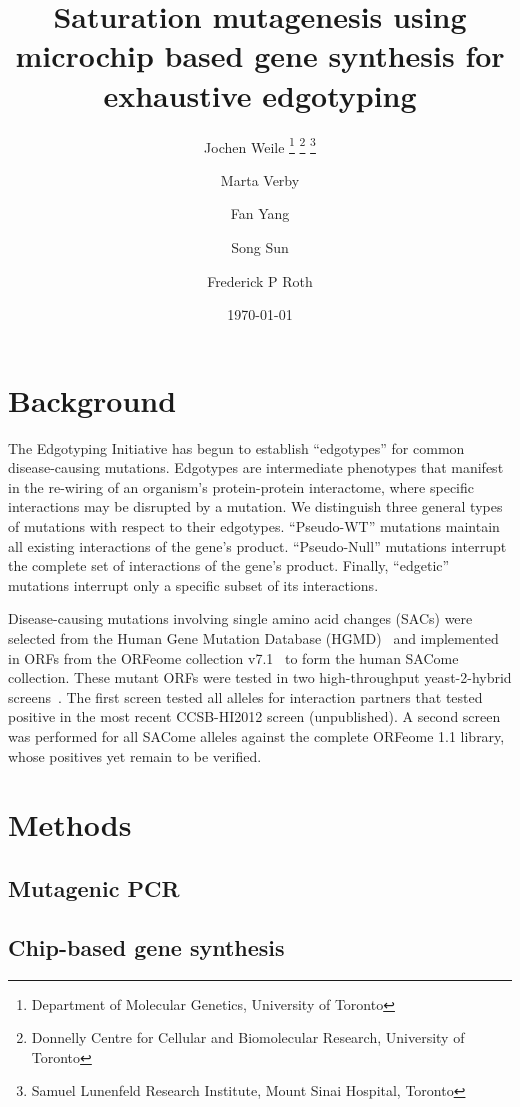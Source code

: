 \documentclass[12pt]{article}
\title{Saturation mutagenesis using microchip based gene synthesis for exhaustive edgotyping}
\author{
	Jochen Weile
		\thanks{Department of Molecular Genetics, University of Toronto}
		\thanks{Donnelly Centre for Cellular and Biomolecular Research, University of Toronto} 
		\thanks{Samuel Lunenfeld Research Institute, Mount Sinai Hospital, Toronto}
	\and Marta Verby
		\samethanks[3]
	\and Fan Yang
		\samethanks[1] \samethanks[3]
	\and Song Sun
		\samethanks[3]
	\and Frederick P Roth 
		\samethanks[1] \samethanks[2] \samethanks[3]
}
\date{\today}
\begin{document}
\maketitle

\section{Background} %
\label{sec:background}

The Edgotyping Initiative has begun to establish ``edgotypes'' for common disease-causing mutations. Edgotypes are intermediate phenotypes that manifest in the re-wiring of an organism's protein-protein interactome, where specific interactions may be disrupted by a mutation. We distinguish three general types of mutations with respect to their edgotypes. ``Pseudo-WT'' mutations maintain all existing interactions of the gene's product. ``Pseudo-Null'' mutations interrupt the complete set of interactions of the gene's product. Finally, ``edgetic'' mutations interrupt only a specific subset of its interactions.

Disease-causing mutations involving single amino acid changes (SACs) were selected from the Human Gene Mutation Database (HGMD)~\cite{stenson_human_2003} and implemented in ORFs from the ORFeome collection v7.1~\cite{rual_human_2004} to form the human SACome collection. These mutant ORFs were tested in two high-throughput yeast-2-hybrid screens~\cite{yu_high-quality_2008}. The first screen tested all alleles for interaction partners that tested positive in the most recent CCSB-HI2012 screen (unpublished). A second screen was performed for all SACome alleles against the complete ORFeome 1.1 library, whose positives yet remain to be verified.



\section{Methods} %
\label{sec:methods}

\subsection{Mutagenic PCR} %
\label{sub:mutagenic_pcr}


\subsection{Chip-based gene synthesis} %
\label{sub:chip_based_gene_synthesis}
\end{document}

